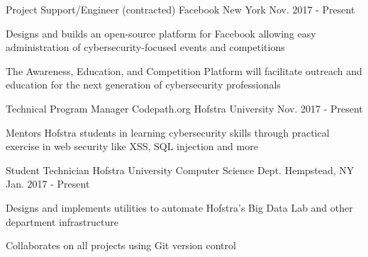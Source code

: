 

\begin{cventries}


\cventry
    {Project Support/Engineer (contracted) } %
    {Facebook} %
    {New York} %
    {Nov. 2017 - Present} %
    {
      \begin{cvitems} %
      \item {Designs and builds an open-source platform for Facebook allowing easy administration of cybersecurity-focused events and competitions}
      \item {The Awareness, Education, and Competition Platform will facilitate outreach and education for the next generation of cybersecurity professionals}
      \end{cvitems}
    }

\cventry
    {Technical Program Manager} %
    {Codepath.org} %
    {Hofstra University} %
    {Nov. 2017 - Present} %
    {
      \begin{cvitems} %
        \item {Mentors Hofstra students in learning cybersecurity skills through practical exercise in web security like XSS, SQL injection and more}
      \end{cvitems}
    }

  \cventry
    {Student Technician} %
    {Hofstra University Computer Science Dept.} %
    {Hempstead, NY} %
    {Jan. 2017 - Present} %
    {
      \begin{cvitems} %
        \item {Designs and implements utilities to automate Hofstra's Big Data Lab and other department infrastructure}
        \item {Collaborates on all projects using Git version control}
      \end{cvitems}
    }

\end{cventries}
